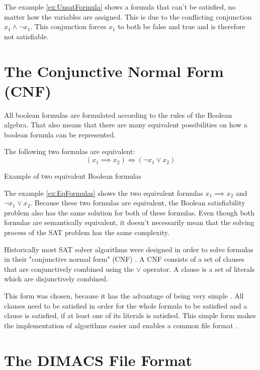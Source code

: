 The example \ref{ex:UnsatFormula} shows a formula that can't be satisfied, no matter how the variables are assigned. This is due to the conflicting conjunction $x_1 \wedge \neg x_1$. This conjunction forces $x_1$ to both be false and true and is therefore not satisfiable.

\section{The Conjunctive Normal Form (CNF)}

All boolean formulas are formulated according to the rules of the Boolean algebra. That also means that there are many equivalent possibilities on how a boolean formula can be represented.

\begin{example}
\begin{leftbar}
The following two formulas are equivalent:
\begin{displaymath}
(x_1 \implies x_2) \iff (\neg x_1 \vee x_2)
\end{displaymath}
\end{leftbar}
\caption{Example of two equivalent Boolean formulas}
\label{ex:EqFormulas}
\end{example}

The example \ref{ex:EqFormulas} shows the two equivalent formulas $x_1 \implies x_2$ and $\neg x_1 \vee x_2$. Because these two formulas are equivalent, the Boolean satisfiability problem also has the same solution for both of these formulas. Even though both formulas are semantically equivalent, it doesn't necessarily mean that the solving process of the SAT problem has the same complexity.

Historically most SAT solver algorithms were designed in order to solve formulas in their "conjunctive normal form" (CNF) \cite{biere2009handbook}. A CNF consists of a set of clauses that are conjunctively combined using the $\vee$ operator. A clause is a set of literals which are disjunctively combined. \cite{biere2009handbook}

This form was chosen, because it has the advantage of being very simple \cite{biere2009handbook}. All clauses need to be satisfied in order for the whole formula to be satisfied and a clause is satisfied, if at least one of its literals is satisfied. This simple form makes the implementation of algorithms easier and enables a common file format \cite{biere2009handbook}.

\section{The DIMACS File Format}

